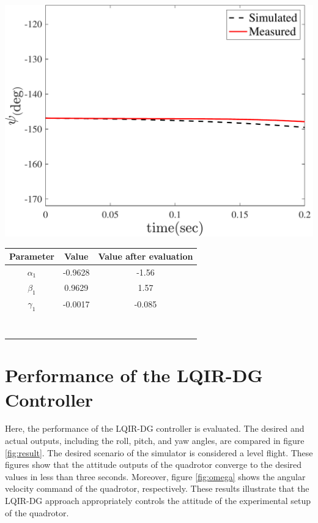 \documentclass[3p,times]{elsarticle}
\newcommand\Tstrut{\rule{0pt}{2.6ex}}         %
\begin{document}
    \hfill
    \begin{minipage}[b]{0.48\linewidth}
		\centering
		\includegraphics[width=1\linewidth]{../Figure/parameter_estimation/3DOF/yaw}
		\captionsetup{justification=centering}
	\end{minipage}
    \begin{minipage}[b]{0.48\linewidth}
		\centering
		\begin{tabular}{ccc}\hline
			Parameter & Value & Value after evaluation
            \Tstrut\\ \hline
			$\alpha_1$  & -0.9628 & -1.56\Tstrut\\
            $\beta_1$  & 0.9629 & 1.57\Tstrut \\
            $\gamma_1$  & -0.0017 &-0.085\Tstrut\\ \hline
            \\\\\\\\\\\\\\\\
		\end{tabular}
	\captionsetup{justification=centering}
	\end{minipage}


\section{Performance of the LQIR-DG Controller}
Here, the performance of the LQIR-DG controller is evaluated. The desired and actual outputs, including the roll, pitch, and yaw angles, are compared in figure \ref{fig:result}. The desired scenario of the simulator is considered a level flight. These figures show that the attitude outputs of the quadrotor converge to the desired values in less than three seconds. Moreover, figure \ref{fig:omega} shows the angular velocity command of the quadrotor, 
respectively. These results illustrate that the LQIR-DG approach appropriately controls the attitude of the experimental setup of the quadrotor.
\end{document}
